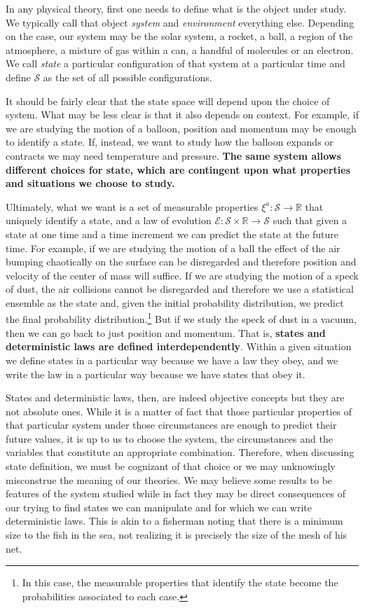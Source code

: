 \documentclass[11pt]{article}
\begin{document}
In any physical theory, first one needs to define what is the object under study. We typically call that object \emph{system} and \emph{environment} everything else. Depending on the case, our system may be the solar system, a rocket, a ball, a region of the atmosphere, a misture of gas within a can, a handful of molecules or an electron. We call \emph{state} a particular configuration of that system at a particular time and define $\mathcal{S}$ as the set of all possible configurations.

It should be fairly clear that the state space will depend upon the choice of system. What may be less clear is that it also depends on context. For example, if we are studying the motion of a balloon, position and momentum may be enough to identify a state. If, instead, we want to study how the balloon expands or contracts we may need temperature and pressure. \textbf{The same system allows different choices for state, which are contingent upon what properties and situations we choose to study.} 

Ultimately, what we want is a set of measurable properties $\xi^a : \mathcal{S} \to \mathbb{R}$ that uniquely identify a state, and a law of evolution $\mathcal{E} : \mathcal{S} \times \mathbb{R} \to \mathcal{S}$ such that given a state at one time and a time increment we can predict the state at the future time. For example, if we are studying the motion of a ball the effect of the air bumping chaotically on the surface can be disregarded and therefore position and velocity of the center of mass will suffice. If we are studying the motion of a speck of dust, the air collisions cannot be disregarded and therefore we use a statistical ensemble as the state and, given the initial probability distribution, we predict the final probability distribution.\footnote{In this case, the measurable properties that identify the state become the probabilities associated to each case.} But if we study the speck of dust in a vacuum, then we can go back to just position and momentum. That is, \textbf{states and deterministic laws are defined interdependently}. Within a given situation we define states in a particular way because we have a law they obey, and we write the law in a particular way because we have states that obey it.

States and deterministic laws, then, are indeed objective concepts but they are not absolute ones. While it is a matter of fact that those particular properties of that particular system under those circumstances are enough to predict their future values, it is up to us to choose the system, the circumstances and the variables that constitute an appropriate combination. Therefore, when discussing state definition, we must be cognizant of that choice or we may unknowingly misconstrue the meaning of our theories. We may believe some results to be features of the system studied while in fact they may be direct consequences of our trying to find states we can manipulate and for which we can write deterministic laws. This is akin to a fisherman noting that there is a minimum size to the fish in the sea, not realizing it is precisely the size of the mesh of his net.
\end{document}
